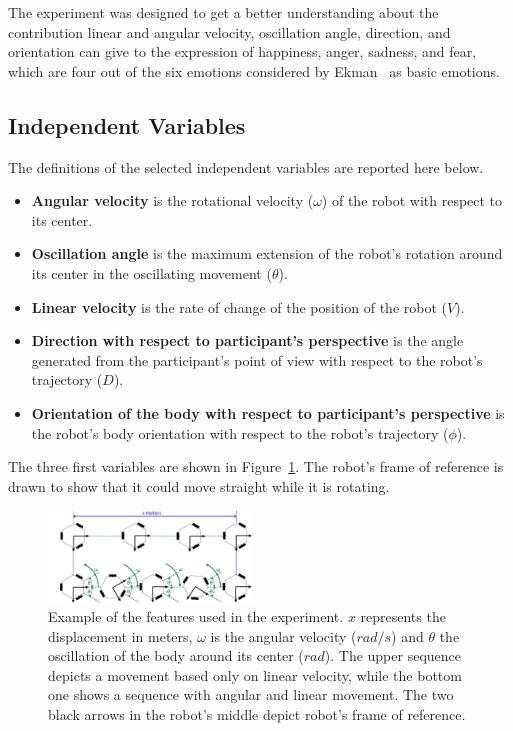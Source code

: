 
The experiment was designed to get a better understanding about the contribution linear and angular velocity, oscillation angle, direction, and orientation can give to the expression of happiness, anger, sadness, and fear, which are four out of the six emotions considered by Ekman~\cite{Ekman2004} as basic emotions.

\subsection{Independent Variables}

The definitions of the selected independent variables are reported here below.

\begin{itemize}
	\item \textbf{Angular velocity} is the rotational velocity  ($\omega$) of the robot with respect to its center.

	\item \textbf{Oscillation angle} is the maximum extension of the robot's rotation around its center in the oscillating movement ($\theta$).

	\item \textbf{Linear velocity} is the rate of change of the position of the robot ($V$). 

	\item \textbf{Direction with respect to participant's perspective} is the angle generated from the participant's point of view with respect to the robot's trajectory ($D$).

	\item \textbf{Orientation of the body with respect to participant's perspective} is the robot's body orientation with respect to the robot's trajectory ($\phi$).

\end{itemize}

The three first variables are shown in Figure~\ref{fig:angular_movement}. The robot's frame of reference is drawn to show that it could move straight while it is rotating.


\begin{figure}
	\centering
	\includegraphics[width=0.48\textwidth]{./Images/ExampleMovement.png} 
	\caption{Example of the features used in the experiment. $x$ represents the displacement in meters, $\omega$ is the angular velocity ($rad/s$) and $\theta$ the oscillation of the body around its center ($rad$). The upper sequence depicts a movement based only on linear velocity, while the bottom one shows a sequence with angular and linear movement. The two black arrows in the robot's middle depict robot's frame of reference.}
	\label{fig:angular_movement}
	
\end{figure} 

